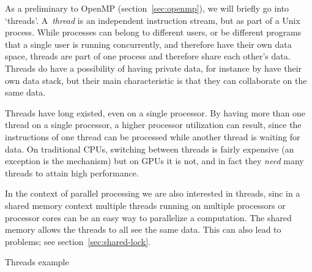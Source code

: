 
As a preliminary to OpenMP (section~\ref{sec:openmp}), we will briefly
go into `threads'.
A~\emph{thread} is an independent instruction stream,
but as part of a Unix process.  While processes can belong to
different users, or be different programs that a single user is
running concurrently, and therefore have their own data space, threads
are part of one process and therefore share each other's data. Threads
do have a possibility of having private data, for instance by have
their own data stack, but their main characteristic is that they can
collaborate on the same data. 

Threads have long existed, even on a single processor.
By having more than one thread on a single processor, a higher
  processor utilization can result, since the instructions of one
  thread can be processed while another thread is waiting for data.
  On traditional CPUs, switching between threads is fairly expensive
  (an exception is the  mechanism)
  but on \acp{GPU} it is not, and in fact they \emph{need} many
  threads to attain high performance.

In the context of parallel processing we are also interested in
threads, sinc in a shared memory context multiple threads running on
multiple processors or processor cores can be an easy way to
parallelize a computation. The shared memory allows the threads to all
see the same data. This can also lead to problems; see
section~\ref{sec:shared-lock}.

 {Threads example}
\label{sec:thread-example}

